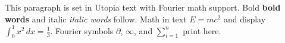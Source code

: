 \documentclass{article}
\begin{document}
This paragraph is set in Utopia text with Fourier math support.
Bold \textbf{bold words} and italic \textit{italic words} follow.
Math in text $E = mc^2$ and display $\int_0^1 x^2\,dx = \frac{1}{3}$.
Fourier symbols $\partial$, $\infty$, and $\sum_{i=1}^{n}$ print here.
\end{document}
